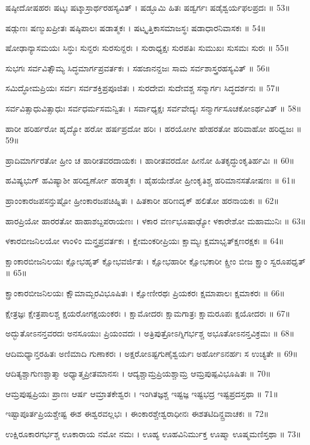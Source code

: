 ಷಷ್ಠೀದೋಷಹರಃ ಷಟ್ಕಃ ಷಟ್ಶಾಸ್ರಾರ್ಥರಹಸ್ಯವಿತ್ ।
ಷಡ್ಭೂಮಿ ಹಿತಃ ಷಡ್ವರ್ಗಃ ಷಡೈಶ್ವರ್ಯಫಲಪ್ರದಃ ॥ 53॥

ಷಡ್ಗುಣಃ ಷಣ್ಮುಖಪ್ರೀತಃ ಷಷ್ಠಿಪಾಲಃ ಷಡಾತ್ಮಕಃ ।
ಷಟ್ಕೃತ್ತಿಕಾಸಮಾಜಸ್ಥಃ ಷಡಾಧಾರನಿವಾಸಕಃ ॥ 54॥

ಷೋಢಾನ್ಯಾಸಮಯಃ ಸಿನ್ಧುಃ ಸುನ್ದರಃ ಸುರಸುನ್ದರಃ ।
ಸುರಾಧ್ಯಕ್ಷಃ ಸುರಪತಿಃ ಸುಮುಖಃ ಸುಸಮಃ ಸುರಃ ॥ 55॥

ಸುಭಗಃ ಸರ್ವವಿತ್ಸೌಮ್ಯ ಸಿದ್ಧಮಾರ್ಗಪ್ರವರ್ತಕಃ ।
ಸಹಜಾನನ್ದಜಃ ಸಾಮ ಸರ್ವಶಾಸ್ತ್ರರಹಸ್ಯವಿತ್ ॥ 56॥

ಸಮಿದ್ಧೋಮಪ್ರಿಯಃ ಸರ್ವಃ ಸರ್ವಶಕ್ತಿಪ್ರಪೂಜಿತಃ ।
ಸುರದೇವಃ ಸುದೇವಶ್ಚ ಸನ್ಮಾರ್ಗಃ ಸಿದ್ಧದರ್ಶನಃ ॥ 57॥

ಸರ್ವವಿತ್ಸಾಧುವಿತ್ಸಾಧುಃ ಸರ್ವಧರ್ಮಸಮನ್ವಿತಃ ।
ಸರ್ವಾಧ್ಯಕ್ಷಃ ಸರ್ವವೇದ್ಯಃ ಸನ್ಮಾರ್ಗಸೂಚಕೋಽರ್ಥವಿತ್ ॥ 58॥

ಹಾರೀ ಹರಿರ್ಹರೋ ಹೃದ್ಯೋ ಹರೋ ಹರ್ಷಪ್ರದೋ ಹರಿಃ ।
ಹರಯೋಗೀ ಹೇಹರತೋ ಹರಿವಾಹೋ ಹರಿಧ್ವಜಃ ॥ 59॥

ಹ್ರಾದಿಮಾರ್ಗರತೋ ಹ್ರೀಂ ಚ ಹಾರೀತವರದಾಯಕಃ ।
ಹಾರೀತವರದೋ ಹೀನೋ ಹಿತಕೃದ್ಧುಂಕೃತಿರ್ಹವಿಃ ॥ 60॥

ಹವಿಷ್ಯಭುಗ್ ಹವಿಷ್ಯಾಶೀ ಹರಿದ್ವರ್ಣೋ ಹರಾತ್ಮಕಃ ।
ಹೈಹಯೇಶೋ ಹ್ರೀಂಕೃತಿಶ್ಚ ಹರಿಮಾನಸತೋಷಣಃ ॥ 61॥

ಹ್ರಾಂಂಕಾರಜಪಸನ್ತುಷ್ಟೋ ಹ್ರೀಂಕಾರಜಪಚಿಹ್ನಿತಃ ।
ಹಿತಕಾರೀ ಹರಿಣದೃಕ್ ಹಲಿತೋ ಹರನಾಯಕಃ ॥ 62॥

ಹಾರಪ್ರಿಯೋ ಹಾರರತೋ ಹಾಹಾಶಬ್ದಪರಾಯಣಃ ।
ಳಕಾರ ವರ್ಣಭೂಷಾಢ್ಯೋ ಳಕಾರೇಶೋ ಮಹಾಮುನಿಃ ॥ 63॥

ಳಕಾರಬೀಜನಿಲಯೋ ಳಾಂಳಿಂ ಮನ್ತ್ರಪ್ರವರ್ತಕಃ ।
ಕ್ಷೇಮಂಕರೀಪ್ರಿಯಃ ಕ್ಷಾಮ್ಯಃ ಕ್ಷಮಾಭೃತ್ಕ್ಷಣರಕ್ಷಕಃ ॥ 64॥

ಕ್ಷಾಂಕಾರಬೀಜನಿಲಯಃ ಕ್ಷೋಭಹೃತ್ ಕ್ಷೋಭವರ್ಜಿತಃ ।
ಕ್ಷೋಭಹಾರೀ ಕ್ಷೋಭಕಾರೀ ಕ್ಷ್ರೀಂ ಬೀಜ ಕ್ಷ್ರಾಂ ಸ್ವರೂಪಧೃತ್ ॥ 65॥

ಕ್ಷ್ರಾಂಕಾರಬೀಜನಿಲಯಃ ಕ್ಷೌಮಾಮ್ಬರವಿಭೂಷಿತಃ ।
ಕ್ಷೋಣೀರಥಃ ಪ್ರಿಯಕರಃ ಕ್ಷಮಾಪಾಲಃ ಕ್ಷಮಾಕರಃ ॥ 66॥

ಕ್ಷೇತ್ರಜ್ಞಃ ಕ್ಷೇತ್ರಪಾಲಶ್ಚ ಕ್ಷಯರೋಗಕ್ಷಯಂಕರಃ ।
ಕ್ಷಾಮೋದರಃ ಕ್ಷಾಮಗಾತ್ರಃ ಕ್ಷಾಮರೂಪಃ ಕ್ಷಯೋದರಃ ॥ 67॥

ಅದ್ಭುತೋಽನನ್ತವರದಃ ಅನಸೂಯುಃ ಪ್ರಿಯಂವದಃ ।
ಅತ್ರಿಪುತ್ರೋಽಗ್ನಿಗರ್ಭಶ್ಚ ಅಭೂತೋಽನನ್ತವಿಕ್ರಮಃ ॥ 68॥

ಆದಿಮಧ್ಯಾನ್ತರಹಿತಃ ಅಣಿಮಾದಿ ಗುಣಾಕರಃ ।
ಅಕ್ಷರೋಽಷ್ಟಗುಣೈಶ್ವರ್ಯಃ ಅರ್ಹೋಽನರ್ಹಃ ಸ ಉಚ್ಯತೇ ॥ 69॥

ಆದಿತ್ಯಶ್ಚಾಗುಣಶ್ಚಾತ್ಮಾ ಅಧ್ಯಾತ್ಮಪ್ರೀತಮಾನಸಃ ।
ಆದ್ಯಶ್ಚಾಮ್ರಪ್ರಿಯಶ್ಚಾಮ್ರ ಆಮ್ರಪುಷ್ಪವಿಭೂಷಿತಃ ॥ 70॥

ಆಮ್ರಪುಷ್ಪಪ್ರಿಯಃ ಪ್ರಾಣಃ ಆರ್ಷ ಆಮ್ರಾತಕೇಶ್ವರಃ ।
ಇಂಗಿತಜ್ಞಶ್ಚ ಇಷ್ಟಜ್ಞ ಇಷ್ಟಭದ್ರ ಇಷ್ಟಪ್ರದಸ್ತಥಾ ॥ 71॥

ಇಷ್ಟಾಪೂರ್ತಪ್ರಿಯಶ್ಚೇಷ್ಟ ಈಶ ಈಶ್ವರವಲ್ಲಭಃ ।
ಈಂಕಾರಶ್ಚೇಶ್ವರಾಧೀನಃ ಈಶತಟಿದಿನ್ದ್ರವಾಚಕಃ ॥ 72॥

ಉಕ್ಷಿರೂಕಾರಗರ್ಭಶ್ಚ ಊಕಾರಾಯ ನಮೋ ನಮಃ ।
ಊಹ್ಯ ಊಹವಿನಿರ್ಮುಕ್ತ ಊಷ್ಮಾ ಊಷ್ಮಮಣಿಸ್ತಥಾ ॥ 73॥

